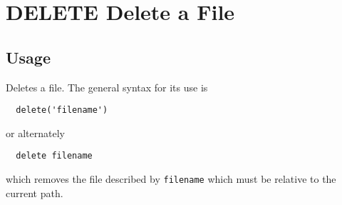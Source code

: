 \section{DELETE Delete a File}

\subsection{Usage}

Deletes a file.  The general syntax for its use is
\begin{verbatim}
  delete('filename')
\end{verbatim}
or alternately
\begin{verbatim}
  delete filename
\end{verbatim}
which removes the file described by \verb|filename| which must
be relative to the current path.

